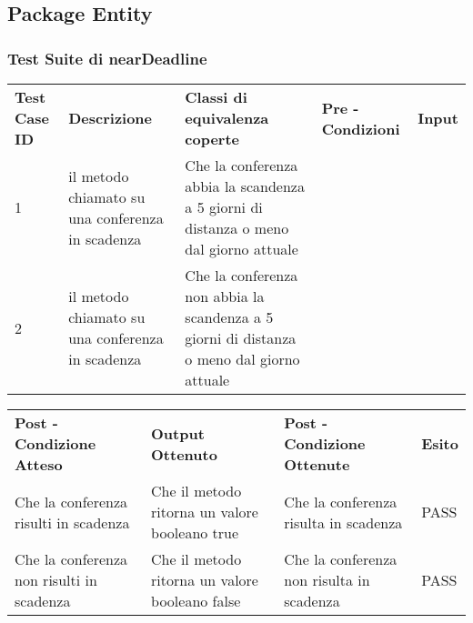 \subsection{Package Entity}
\label{sec:test_funzionale_package_entity}

\subsubsection{Test Suite di nearDeadline}
\begin{tabular}{|p{2.5cm}|p{2.5cm}|p{3cm}|p{1.5cm}|p{5cm}|}
\hline
\rowcolor{SkyBlue}
\multicolumn{5}{l}{\textbf{p1}}\\
\hline
\rowcolor{Red}
\textbf{Test Case ID} & \textbf{Descrizione} & \textbf{Classi di equivalenza coperte} & \textbf{Pre - Condizioni} & \textbf{Input} \\
\hline
1&il metodo chiamato su una conferenza in scadenza&Che la conferenza abbia la scandenza a 5 giorni di distanza o meno dal giorno attuale&&\\
\hline
2&il metodo chiamato su una conferenza in scadenza&Che la conferenza non abbia la scandenza a 5 giorni di distanza o meno dal giorno attuale&&\\
\hline
\end{tabular}


\begin{tabular}{|p{3.5cm}|p{3cm}|p{3cm}|p{1cm}|}
\hline
\rowcolor{SkyBlue}
\multicolumn{4}{l}{\textbf{p2}}\\
\hline
\rowcolor{Red}
 \textbf{Post - Condizione Atteso} & \textbf{Output Ottenuto}& \textbf{Post - Condizione Ottenute}& \textbf{Esito}\\
\hline
Che la conferenza risulti in scadenza&Che il metodo ritorna un valore booleano true&Che la conferenza risulta in scadenza&PASS\\
\hline
Che la conferenza non risulti in scadenza&Che il metodo ritorna un valore booleano false&Che la conferenza non risulta in scadenza&PASS\\
\hline
\end{tabular}


